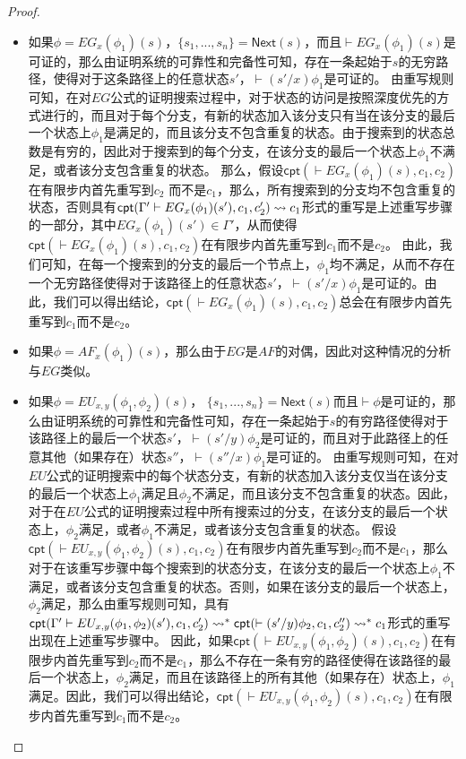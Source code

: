 \begin{proof}
\begin{itemize}
		\item 如果$\phi = EG_x(\phi_1)(s)$，$\{s_1,...,s_n\}=\textsf{Next}(s)$，而且$\vdash EG_x(\phi_1)(s)$是可证的，那么由证明系统的可靠性和完备性可知，存在一条起始于$s$的无穷路径，使得对于这条路径上的任意状态$s'$，$\vdash(s'/x)\phi_1$是可证的。
		由重写规则可知，在对$EG$公式的证明搜索过程中，对于状态的访问是按照深度优先的方式进行的，而且对于每个分支，有新的状态加入该分支只有当在该分支的最后一个状态上$\phi_1$是满足的，而且该分支不包含重复的状态。由于搜索到的状态总数是有穷的，因此对于搜索到的每个分支，在该分支的最后一个状态上$\phi_1$不满足，或者该分支包含重复的状态。
		那么，假设$\textsf{cpt}(\vdash EG_x(\phi_1)(s),c_1,c_2)$在有限步内首先重写到$c_2$ 而不是$c_1$，那么，所有搜索到的分支均不包含重复的状态，否则具有$\textsf{cpt}(\Gamma'\vdash EG_x(\phi_1)(s'), c_1,c_2')\rightsquigarrow c_1$形式的重写是上述重写步骤的一部分，其中$EG_x(\phi_1)(s')\in\Gamma'$，从而使得 $\textsf{cpt}(\vdash EG_x(\phi_1)(s),c_1,c_2)$在有限步内首先重写到$c_1$而不是$c_2$。 由此，我们可知，在每一个搜索到的分支的最后一个节点上，$\phi_1$均不满足，从而不存在一个无穷路径使得对于该路径上的任意状态$s'$，$\vdash (s'/x)\phi_1$是可证的。由此，我们可以得出结论，$\textsf{cpt}(\vdash EG_x(\phi_1)(s),c_1,c_2)$总会在有限步内首先重写到$c_1$而不是$c_2$。
		
		\item
		如果$\phi = AF_x(\phi_1)(s)$，那么由于$EG$是$AF$的对偶，因此对这种情况的分析与$EG$类似。
		
		\item 如果$\phi=EU_{x,y}(\phi_1,\phi_2)(s)$， $\{s_1,...,s_n\}= \textsf{Next}(s)$而且$\vdash \phi$是可证的，那么由证明系统的可靠性和完备性可知，存在一条起始于$s$的有穷路径使得对于该路径上的最后一个状态$s'$，$\vdash(s'/y)\phi_2$是可证的，而且对于此路径上的任意其他（如果存在）状态$s''$，$\vdash(s''/x)\phi_1$是可证的。
		由重写规则可知，在对$EU$公式的证明搜索中的每个状态分支，有新的状态加入该分支仅当在该分支的最后一个状态上$\phi_1$满足且$\phi_2$不满足，而且该分支不包含重复的状态。因此，对于在$EU$公式的证明搜索过程中所有搜索过的分支，在该分支的最后一个状态上，$\phi_2$满足，或者$\phi_1$不满足，或者该分支包含重复的状态。
		假设$\textsf{cpt}(\vdash EU_{x,y}(\phi_1,\phi_2)(s), c_1, c_2)$在有限步内首先重写到$c_2$而不是$c_1$，那么对于在该重写步骤中每个搜索到的状态分支，在该分支的最后一个状态上$\phi_1$不满足，或者该分支包含重复的状态。否则，如果在该分支的最后一个状态上，$\phi_2$满足，那么由重写规则可知，具有\\ 
		$\textsf{cpt}(\Gamma'\vdash EU_{x,y}(\phi_1,\phi_2)(s'), c_1, c_2')\rightsquigarrow^*\\
		\textsf{cpt}(\vdash (s'/y)\phi_2, c_1,c_2'')\rightsquigarrow^*c_1$形式的重写出现在上述重写步骤中。
		因此，如果$\textsf{cpt}(\vdash EU_{x,y}(\phi_1,\phi_2)(s), c_1, c_2)$在有限步内首先重写到$c_2$而不是$c_1$，那么不存在一条有穷的路径使得在该路径的最后一个状态上，$\phi_2$满足，而且在该路径上的所有其他（如果存在）状态上，$\phi_1$满足。因此，我们可以得出结论，$\textsf{cpt}(\vdash EU_{x,y}(\phi_1,\phi_2)(s), c_1, c_2)$在有限步内首先重写到$c_1$而不是$c_2$。
		

\end{itemize}
\end{proof}

